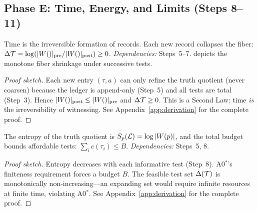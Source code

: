 \subsection{Phase E: Time, Energy, and Limits (Steps 8--11)}
\label{sec:derivation:time}

\begin{theorem}
\label{thm:time}
Time is the irreversible formation of records.  Each new record collapses the fiber:
$\Delta\mathcal{T} = \log(|W()|_{\mathrm{pre}} / |W()|_{\mathrm{post}}) \geq 0$.
\emph{Dependencies:} Steps~5--7.
 depicts the monotone fiber shrinkage under successive tests.
\begin{proof}[Proof sketch]
Each new entry $(\tau, a)$ can only refine the truth quotient (never coarsen) because the ledger is append-only (Step~5) and all tests are total (Step~3).  Hence $|W()|_{\mathrm{post}} \leq |W()|_{\mathrm{pre}}$ and $\Delta\mathcal{T} \geq 0$.  This is a Second Law: time \emph{is} the irreversibility of witnessing.
See Appendix~\ref{app:derivation} for the complete proof.
\end{proof}
\end{theorem}

\begin{theorem}
\label{thm:entropy}
The entropy of the truth quotient is $S_p(\mathcal{L}) = \log |W(p)|$, and the total budget bounds affordable tests: $\sum_i c(\tau_i) \leq B$.
\emph{Dependencies:} Steps~5, 8.
\begin{proof}[Proof sketch]
Entropy decreases with each informative test (Step~8).  A0$^*$'s finiteness requirement forces a budget $B$.  The feasible test set $\Delta(\mathcal{T})$ is monotonically non-increasing---an expanding set would require infinite resources at finite time, violating A0$^*$.
See Appendix~\ref{app:derivation} for the complete proof.
\end{proof}
\end{theorem}

